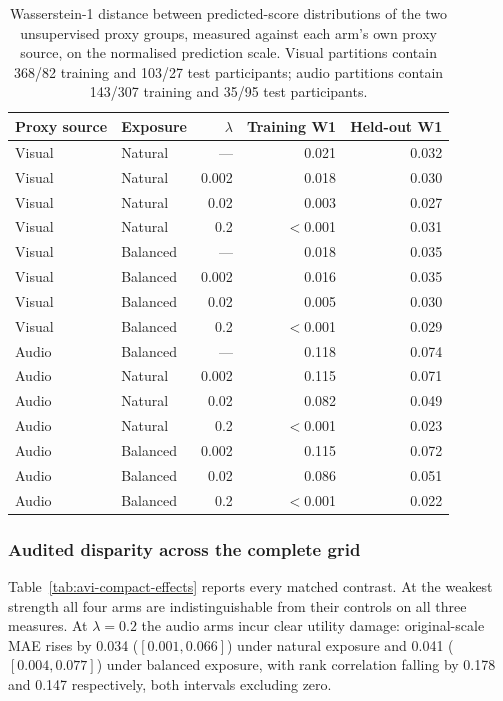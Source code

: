 \begin{table}[htbp]
\centering
\caption[Training and held-out proxy response]{Wasserstein-1 distance between predicted-score
distributions of the two unsupervised proxy groups, measured against each arm's own proxy
source, on the normalised prediction scale. Visual partitions contain 368/82 training and
103/27 test participants; audio partitions contain 143/307 training and 35/95 test
participants.}
\label{tab:avi-compact-mechanism}
\small
\begin{tabular}{llrrr}
\toprule
Proxy source & Exposure & $\lambda$ & Training W1 & Held-out W1 \\
\midrule
Visual & Natural & --- & 0.021 & 0.032 \\
Visual & Natural & 0.002 & 0.018 & 0.030 \\
Visual & Natural & 0.02 & 0.003 & 0.027 \\
Visual & Natural & 0.2 & $<$0.001 & 0.031 \\
\addlinespace
Visual & Balanced & --- & 0.018 & 0.035 \\
Visual & Balanced & 0.002 & 0.016 & 0.035 \\
Visual & Balanced & 0.02 & 0.005 & 0.030 \\
Visual & Balanced & 0.2 & $<$0.001 & 0.029 \\
\addlinespace
Audio & Balanced & --- & 0.118 & 0.074 \\
Audio & Natural & 0.002 & 0.115 & 0.071 \\
Audio & Natural & 0.02 & 0.082 & 0.049 \\
Audio & Natural & 0.2 & $<$0.001 & 0.023 \\
Audio & Balanced & 0.002 & 0.115 & 0.072 \\
Audio & Balanced & 0.02 & 0.086 & 0.051 \\
Audio & Balanced & 0.2 & $<$0.001 & 0.022 \\
\bottomrule
\end{tabular}
\end{table}
\FloatBarrier

\subsubsection{Audited disparity across the complete grid}

Table~\ref{tab:avi-compact-effects} reports every matched contrast. At the weakest strength
all four arms are indistinguishable from their controls on all three measures. At
$\lambda=0.2$ the audio arms incur clear utility damage: original-scale MAE rises by 0.034
($[0.001, 0.066]$) under natural exposure and 0.041 ($[0.004, 0.077]$) under balanced
exposure, with rank correlation falling by 0.178 and 0.147 respectively, both intervals
excluding zero.

